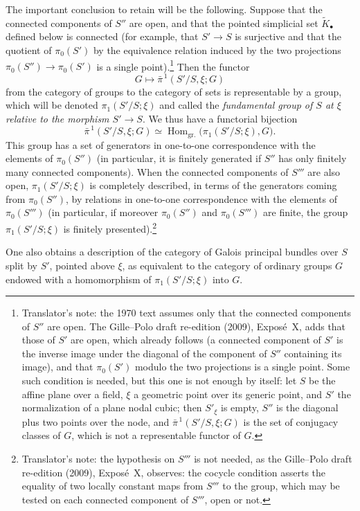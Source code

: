 The important conclusion to retain will be the following. Suppose that the
connected components of \(S''\) are open, and that the pointed simplicial set
\(\widetilde K_\bullet\) defined below is connected (for example, that
\(S'\to S\) is surjective and that the quotient of \(\pi_0(S')\) by the
equivalence relation induced by the two projections
\(\pi_0(S'')\to\pi_0(S')\) is a single point).\footnote{Translator's note: the
1970 text assumes only that the connected components of \(S''\) are open.
The Gille--Polo draft re-edition (2009), Expos\'e~X, adds that those of
\(S'\) are open, which already follows (a connected component of \(S'\) is
the inverse image under the diagonal of the component of \(S''\) containing
its image), and that \(\pi_0(S')\) modulo the two projections is a single
point. Some such condition is needed, but this one is not enough by itself:
let \(S\) be the affine plane over a field, \(\xi\) a geometric point over its
generic point, and \(S'\) the normalization of a plane nodal cubic; then
\(S'_\xi\) is empty, \(S''\) is the diagonal plus two points over the node,
and \(\bar\pi^{\,1}(S'/S,\xi;G)\) is the set of conjugacy classes of \(G\),
which is not a representable functor of \(G\).} Then the functor
\[
  G\longmapsto\bar\pi^{\,1}(S'/S,\xi;G)
\]
from the category of groups to the category of sets is representable by a
group, which will be denoted \(\pi_1(S'/S;\xi)\) and called the
\emph{fundamental group of \(S\) at \(\xi\) relative to the morphism
\(S'\to S\)}. We thus have a functorial bijection
\[
  \bar\pi^{\,1}(S'/S,\xi;G)
  \simeq
  \operatorname{Hom}_{\mathrm{gr.}}\bigl(\pi_1(S'/S;\xi),G\bigr).
\]
This group has a set of generators in one-to-one correspondence with the
elements of \(\pi_0(S'')\) (in particular, it is finitely generated if
\(S''\) has only finitely many connected components). When the connected
components of \(S'''\) are also open, \(\pi_1(S'/S;\xi)\) is completely
described, in terms of the generators coming from \(\pi_0(S'')\), by
relations in one-to-one correspondence with the elements of \(\pi_0(S''')\)
(in particular, if moreover \(\pi_0(S'')\) and \(\pi_0(S''')\) are finite,
the group \(\pi_1(S'/S;\xi)\) is finitely presented).\footnote{Translator's
note: the hypothesis on \(S'''\) is not needed, as the Gille--Polo draft
re-edition (2009), Expos\'e~X, observes: the cocycle condition asserts the
equality of two locally constant maps from \(S'''\) to the group, which may
be tested on each connected component of \(S'''\), open or not.}

One also obtains a description of the category of Galois principal bundles
over \(S\) split by \(S'\), pointed above \(\xi\), as equivalent to the
category of ordinary groups \(G\) endowed with a homomorphism of
\(\pi_1(S'/S;\xi)\) into \(G\).

